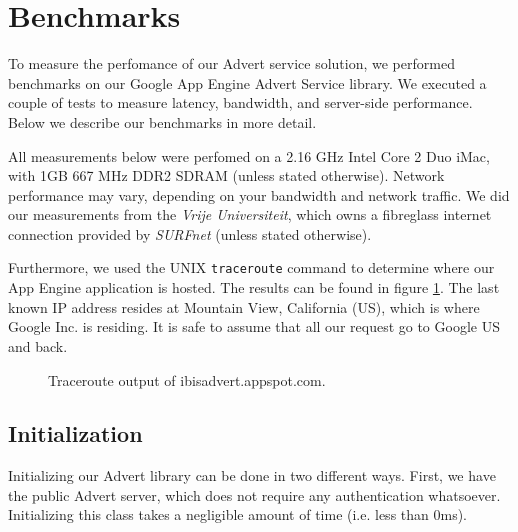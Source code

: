\section{Benchmarks}
To measure the perfomance of our Advert service solution, we performed
benchmarks on our Google App Engine Advert Service library. We executed a
couple of tests to measure latency, bandwidth, and server-side performance.
Below we describe our benchmarks in more detail.

All measurements below were perfomed on a 2.16 GHz Intel Core 2 Duo iMac, with
1GB 667 MHz DDR2 SDRAM (unless stated otherwise). Network performance may vary,
depending on your bandwidth and network traffic. We did our measurements from
the \emph{Vrije Universiteit}, which owns a fibreglass internet connection
provided by \emph{SURFnet} (unless stated otherwise).

Furthermore, we used the UNIX \texttt{traceroute} command to determine where our
App Engine application is hosted. The results can be found in figure
\ref{tracert}. The last known IP address resides at Mountain View, California
(US), which is where Google Inc. is residing. It is safe to assume that all our
request go to Google US and back.

\begin{figure} %
\begin{center}
\caption{Traceroute output of ibisadvert.appspot.com.\label{tracert}}
\end{center}
\end{figure}

\subsection{Initialization}
Initializing our Advert library can be done in two different ways. First, we
have the public Advert server, which does not require any authentication 
whatsoever. Initializing this class takes a negligible amount of time (i.e.
less than 0ms).

